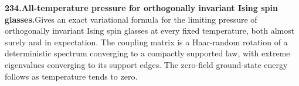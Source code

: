 \documentclass[11pt,a4paper]{article}
\begin{document}
  \par \begin{minipage}{\linewidth}
  \fontsize{10.5}{12.6}\selectfont\RaggedRight
  \hypertarget{result 234}{}
  {\bfseries\textcolor{muted}{234.}\enspace All-temperature pressure for orthogonally invariant Ising spin glasses.}\enspace Gives an exact variational formula for the limiting pressure of orthogonally invariant Ising spin glasses at every fixed temperature, both almost surely and in expectation. The coupling matrix is a Haar-random rotation of a deterministic spectrum converging to a compactly supported law, with extreme eigenvalues converging to its support edges. The zero-field ground-state energy follows as temperature tends to zero.\par
  \end{minipage}\par\vspace{5pt}
\end{document}
